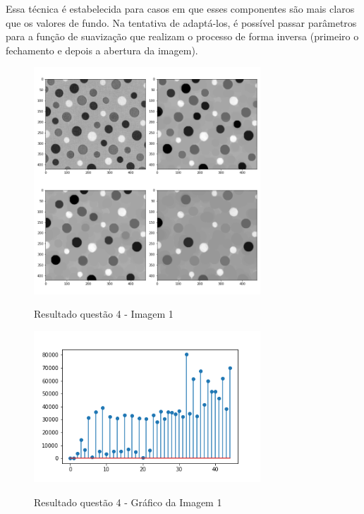 \documentclass{article}
\begin{document}
Essa técnica é estabelecida para casos em que esses componentes são mais claros que os valores de fundo. Na tentativa de adaptá-los, é possível passar parâmetros para a função de suavização que realizam o processo de forma inversa (primeiro o fechamento e depois a abertura da imagem). 

\begin{figure}[H]
	\label{fig: q4_1}
	\begin{minipage}[b]{1.0\linewidth}
		\centering
		\centerline{\includegraphics[width=8.5cm]{Figures/result4_1}}
		\centerline{Resultado questão 4 - Imagem 1}\medskip	
	\end{minipage}
\end{figure}

\begin{figure}[H]
	\label{fig: q4_1_graph}
	\begin{minipage}[b]{1.0\linewidth}
		\centering
		\centerline{\includegraphics[width=8.5cm]{Figures/result4_1_graph}}
		\centerline{Resultado questão 4 - Gráfico da Imagem 1}\medskip	
	\end{minipage}
\end{figure}
\end{document}
